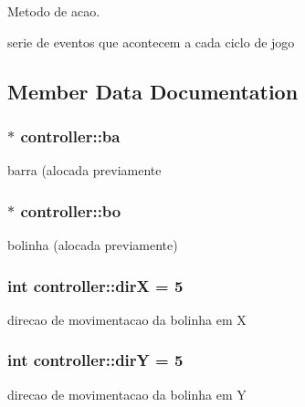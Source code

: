 Metodo de acao. 

serie de eventos que acontecem a cada ciclo de jogo 

\subsection{Member Data Documentation}
\subsubsection[{\texorpdfstring{ba}{ba}}]{$\ast$ controller\+::ba\hspace{0.3cm}{\ttfamily [private]}}\hypertarget{classcontroller_af46499f5a9ef1afc0c95d899fb128aa1}{}\label{classcontroller_af46499f5a9ef1afc0c95d899fb128aa1}
barra (alocada previamente 
\subsubsection[{\texorpdfstring{bo}{bo}}]{$\ast$ controller\+::bo\hspace{0.3cm}{\ttfamily [private]}}\hypertarget{classcontroller_ae3e29aaa568c3d374b65416fd49649c5}{}\label{classcontroller_ae3e29aaa568c3d374b65416fd49649c5}
bolinha (alocada previamente) 
\subsubsection[{\texorpdfstring{dirX}{dirX}}]{\setlength{\rightskip}{0pt plus 5cm}int controller\+::dirX = 5\hspace{0.3cm}{\ttfamily [private]}}\hypertarget{classcontroller_ab7bee2a38038001992ab877caccc1a47}{}\label{classcontroller_ab7bee2a38038001992ab877caccc1a47}
direcao de movimentacao da bolinha em X 
\subsubsection[{\texorpdfstring{dirY}{dirY}}]{\setlength{\rightskip}{0pt plus 5cm}int controller\+::dirY = 5\hspace{0.3cm}{\ttfamily [private]}}\hypertarget{classcontroller_a136888a5f98296f5266a01330e2881e7}{}\label{classcontroller_a136888a5f98296f5266a01330e2881e7}
direcao de movimentacao da bolinha em Y 
